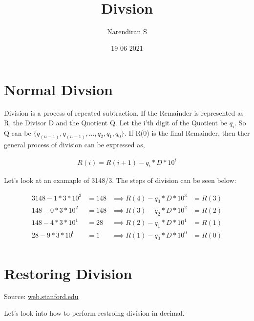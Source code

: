 \documentclass{article}
\title{Divsion}
\author{Narendiran S}
\date{19-06-2021}
\begin{document}
\large
\maketitle

\section{Normal Divsion}
Division is a process of repeated subtraction.
If the Remainder is represented as R, the Divisor D and the Quotient Q.
Let the i'th digit of the Quotient be $q_i$.
So Q can be $\{ q_(n-1), q_(n-1), \dots, q_2, q_1, q_0 \}$.
If R(0) is the final Remainder, then ther general process of division can be expressed as,

\begin{align*}
    R(i) = R(i + 1) - q_i * D * 10^i
\end{align*}

Let's look at an examaple of 3148/3.
The steps of division can be seen below:

\begin{align*}
    3148 - 1 * 3 * 10^3 & =148  & \implies R(4) - q_3 * D * 10^3 & = R(3) \\
    148 - 0 * 3 * 10^2  & = 148 & \implies R(3) - q_2 * D * 10^2 & = R(2) \\
    148 - 4 * 3 * 10^1  & = 28  & \implies R(2) - q_1 * D * 10^1 & = R(1) \\
    28 - 9 * 3 * 10^0   & = 1   & \implies R(1) - q_0 * D * 10^0 & = R(0) \\
\end{align*}

\section{Restoring Division}

Source: \href{https://web.stanford.edu/class/ee486/doc/chap5.pdf}{web.stanford.edu}

Let's look into how to perform restroing division in decimal.
\end{document}
